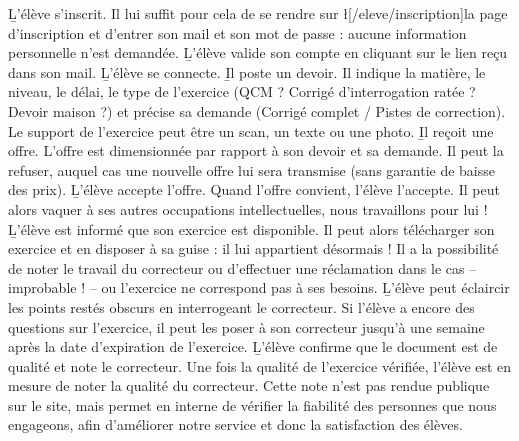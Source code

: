 ﻿\begin{enumerate}
	\li \b{L’élève s’inscrit.} Il lui suffit pour cela de se rendre sur \l[/eleve/inscription]{la page d’inscription} et d’entrer son mail et son mot de passe : aucune information personnelle n’est demandée.
   \li \b{L’élève valide son compte en cliquant sur le lien reçu dans son mail.}
   \li \b{L’élève se connecte.}
   \li \b{Il poste un devoir.} Il indique la matière, le niveau, le délai, le type de l’exercice (QCM ? Corrigé d’interrogation ratée ? Devoir maison ?) et précise sa demande (Corrigé complet / Pistes de correction). Le support de l’exercice peut être un scan, un texte ou une photo.
   \li \b{Il reçoit une offre.} L’offre est dimensionnée par rapport à son devoir et sa demande. Il peut la refuser, auquel cas une nouvelle offre lui sera transmise (sans garantie de baisse des prix).
   \li \b{L’élève accepte l’offre.} Quand l’offre convient, l’élève l’accepte. Il peut alors vaquer à ses autres occupations intellectuelles, nous travaillons pour lui !
   \li \b{L’élève est informé que son exercice est disponible.} Il peut alors télécharger son exercice et en disposer à sa guise : il lui appartient désormais ! Il a la possibilité de noter le travail du correcteur ou d’effectuer une réclamation dans le cas -- improbable ! -- ou l’exercice ne correspond pas à ses besoins.
   \li \b{L’élève peut éclaircir les points restés obscurs en interrogeant le correcteur.} Si l’élève a encore des questions sur l’exercice, il peut les poser à son correcteur jusqu’à une semaine après la date d’expiration de l’exercice.
   \li \b{L'élève confirme que le document est de qualité et note le correcteur.} Une fois la qualité de l’exercice vérifiée, l’élève est en mesure de noter la qualité du correcteur. Cette note n’est pas rendue publique sur le site, mais permet en interne de vérifier la fiabilité des personnes que nous engageons, afin d’améliorer notre service et donc la satisfaction des élèves.
\end{enumerate}